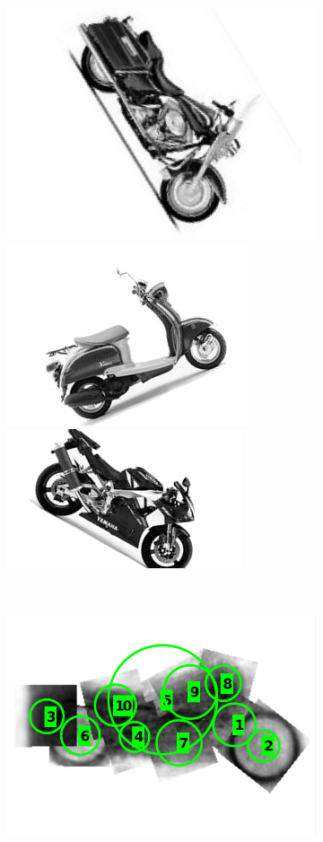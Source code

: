 \begin{figure}[ht]
\centering
\begin{subfigure}[b]{0.90\linewidth} \centering 
	\includegraphics[height=0.20\linewidth]{fig/reg/onebike_before2.png}
	\includegraphics[height=0.20\linewidth]{fig/reg/onebike_before3.png}
	\includegraphics[height=0.20\linewidth]{fig/reg/onebike_before4.png}
	\label{fig/reg/concept1}
\end{subfigure} \\
\begin{subfigure}[b]{0.35\linewidth} \centering
	\includegraphics[width=\linewidth]{fig/reg/pictorial2.pdf}
	\label{fig/reg/concept3}
\end{subfigure} \hspace{5mm}

\end{figure}
